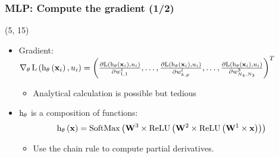 
\begin{frame}[label=Backpropagation]
  \frametitle{\acl{MLP}: Compute the gradient (1/2)}

  \begin{textblock}{90}(5, 15)
    \begin{itemize}
    \item Gradient:
      $
      \operatorname{\nabla}_{\mathbf{\theta}} \mathrm{L} \left ( {\mathrm{h}_{\mathbf{\theta}} \left ( {\mathbf{x}_i} \right ), u_i} \right ) =
      \left( \frac{\partial \mathrm{L} \left ( {\mathrm{h}_{\mathbf{\theta}} \left ( {\mathbf{x}_i} \right ), u_i} \right ) }{\partial w_{1,1}^1},\ldots,\frac{\partial \mathrm{L} \left ( {\mathrm{h}_{\mathbf{\theta}} \left ( {\mathbf{x}_i} \right ), u_i} \right ) }{\partial w_{k,p}^l},\ldots,\frac{\partial \mathrm{L} \left ( {\mathrm{h}_{\mathbf{\theta}} \left ( {\mathbf{x}_i} \right ), u_i} \right ) }{\partial w_{N_{4},N_{3}}^{3}} \right)^T
      $

      \begin{itemize}
      \item Analytical calculation is possible but tedious
      \end{itemize}
    \item $\mathrm{h}_{\mathbf{\theta}}$ is a composition of functions:
      \[
        \apply{\hyp_{\params}}{\example} = \apply{\softMaxFunc}{%
          \weightMatrix^3 \times
          \apply{\ReLUFunc}{%
            \weightMatrix^2 \times
            \apply{\ReLUFunc}{%
              \weightMatrix^1 \times \example
            }
          }
        }
      \]
      \begin{itemize}
      \item Use the chain rule to compute partial derivatives.
      \end{itemize}
    \end{itemize}
  \end{textblock}
\end{frame}


